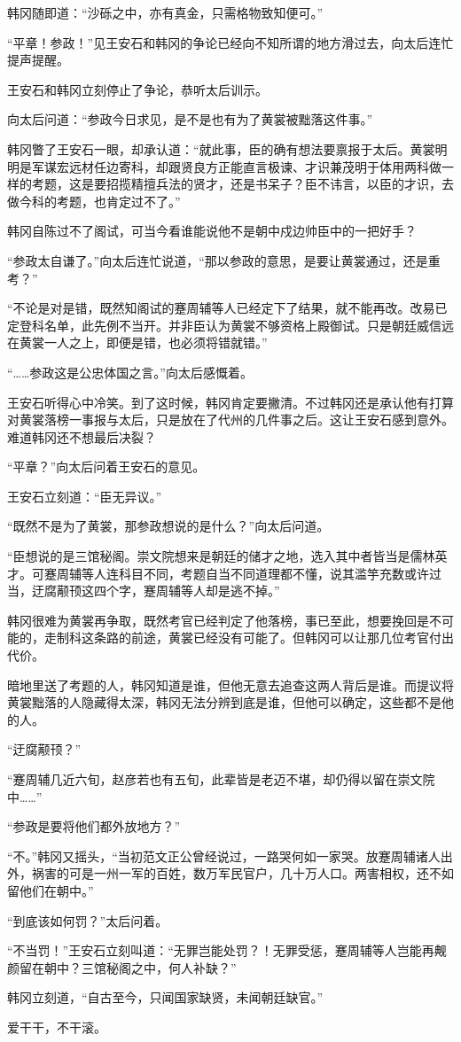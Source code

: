 韩冈随即道：“沙砾之中，亦有真金，只需格物致知便可。”

“平章！参政！”见王安石和韩冈的争论已经向不知所谓的地方滑过去，向太后连忙提声提醒。

王安石和韩冈立刻停止了争论，恭听太后训示。

向太后问道：“参政今日求见，是不是也有为了黄裳被黜落这件事。”

韩冈瞥了王安石一眼，却承认道：“就此事，臣的确有想法要禀报于太后。黄裳明明是军谋宏远材任边寄科，却跟贤良方正能直言极谏、才识兼茂明于体用两科做一样的考题，这是要招揽精擅兵法的贤才，还是书呆子？臣不讳言，以臣的才识，去做今科的考题，也肯定过不了。”

韩冈自陈过不了阁试，可当今看谁能说他不是朝中戍边帅臣中的一把好手？

“参政太自谦了。”向太后连忙说道，“那以参政的意思，是要让黄裳通过，还是重考？”

“不论是对是错，既然知阁试的蹇周辅等人已经定下了结果，就不能再改。改易已定登科名单，此先例不当开。并非臣认为黄裳不够资格上殿御试。只是朝廷威信远在黄裳一人之上，即便是错，也必须将错就错。”

“……参政这是公忠体国之言。”向太后感慨着。

王安石听得心中冷笑。到了这时候，韩冈肯定要撇清。不过韩冈还是承认他有打算对黄裳落榜一事报与太后，只是放在了代州的几件事之后。这让王安石感到意外。难道韩冈还不想最后决裂？

“平章？”向太后问着王安石的意见。

王安石立刻道：“臣无异议。”

“既然不是为了黄裳，那参政想说的是什么？”向太后问道。

“臣想说的是三馆秘阁。崇文院想来是朝廷的储才之地，选入其中者皆当是儒林英才。可蹇周辅等人连科目不同，考题自当不同道理都不懂，说其滥竽充数或许过当，迂腐颟顸这四个字，蹇周辅等人却是逃不掉。”

韩冈很难为黄裳再争取，既然考官已经判定了他落榜，事已至此，想要挽回是不可能的，走制科这条路的前途，黄裳已经没有可能了。但韩冈可以让那几位考官付出代价。

暗地里送了考题的人，韩冈知道是谁，但他无意去追查这两人背后是谁。而提议将黄裳黜落的人隐藏得太深，韩冈无法分辨到底是谁，但他可以确定，这些都不是他的人。

“迂腐颟顸？”

“蹇周辅几近六旬，赵彦若也有五旬，此辈皆是老迈不堪，却仍得以留在崇文院中……”

“参政是要将他们都外放地方？”

“不。”韩冈又摇头，“当初范文正公曾经说过，一路哭何如一家哭。放蹇周辅诸人出外，祸害的可是一州一军的百姓，数万军民官户，几十万人口。两害相权，还不如留他们在朝中。”

“到底该如何罚？”太后问着。

“不当罚！”王安石立刻叫道：“无罪岂能处罚？！无罪受惩，蹇周辅等人岂能再觍颜留在朝中？三馆秘阁之中，何人补缺？”

韩冈立刻道，“自古至今，只闻国家缺贤，未闻朝廷缺官。”

爱干干，不干滚。
